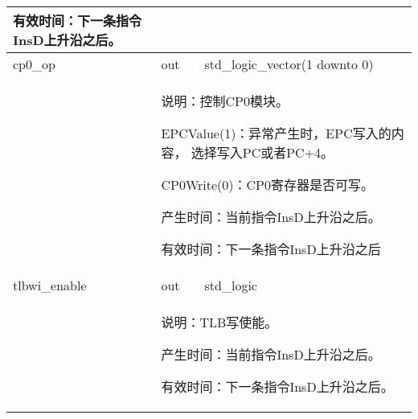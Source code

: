 \begin{tabularx}{\textwidth}{lll}
{                有效时间：下一条指令InsD上升沿之后。 
            } \\
            \midrule
            cp0\_op         & out       & std\_logic\_vector(1 downto 0) \\
            \cmidrule(l){2-3}
            &
            \multicolumn{2}{X}{
                说明：控制CP0模块。

                EPCValue(1)：异常产生时，EPC写入的内容，%
                选择写入PC或者PC+4。

                CP0Write(0)：CP0寄存器是否可写。

                产生时间：当前指令InsD上升沿之后。

                有效时间：下一条指令InsD上升沿之后 
            } \\
            \midrule
            tlbwi\_enable   & out       & std\_logic \\
            \cmidrule(l){2-3}
            &
            \multicolumn{2}{X}{
                说明：TLB写使能。

                产生时间：当前指令InsD上升沿之后。

                有效时间：下一条指令InsD上升沿之后。
            } \\
            \bottomrule
            \end{tabularx}
